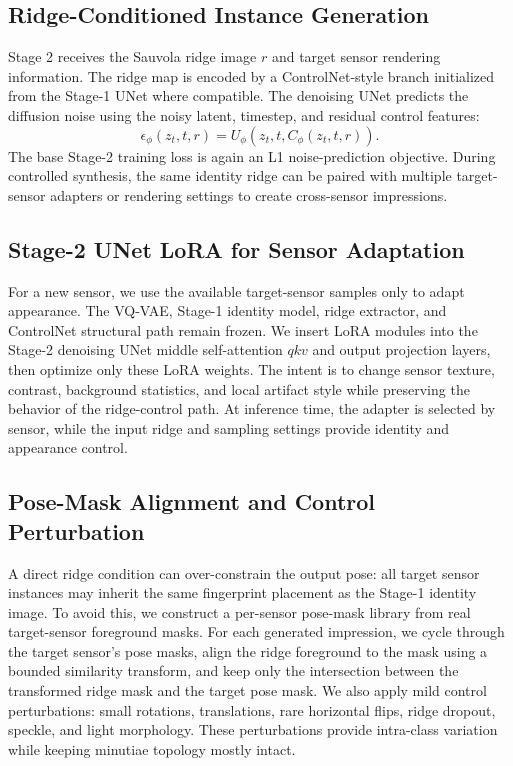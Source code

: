 \documentclass{article}
\begin{document}
\subsection{Ridge-Conditioned Instance Generation}

Stage 2 receives the Sauvola ridge image $r$ and target sensor rendering
information.  The ridge map is encoded by a ControlNet-style branch initialized
from the Stage-1 UNet where compatible.  The denoising UNet predicts the
diffusion noise using the noisy latent, timestep, and residual control
features:
\[
    \epsilon_\phi(z_t,t,r) =
    U_\phi\left(z_t,t,C_\phi(z_t,t,r)\right).
\]
The base Stage-2 training loss is again an L1 noise-prediction objective.
During controlled synthesis, the same identity ridge can be paired with
multiple target-sensor adapters or rendering settings to create cross-sensor
impressions.

\subsection{Stage-2 UNet LoRA for Sensor Adaptation}

For a new sensor, we use the available target-sensor samples only to adapt
appearance.  The VQ-VAE, Stage-1 identity model, ridge extractor, and
ControlNet structural path remain frozen.  We insert LoRA modules into the
Stage-2 denoising UNet middle self-attention $qkv$ and output projection
layers, then optimize only these LoRA weights.
The intent is to change sensor texture, contrast, background statistics, and
local artifact style while preserving the behavior of the ridge-control path.
At inference time, the adapter is selected by sensor, while the input ridge and
sampling settings provide identity and appearance control.

\subsection{Pose-Mask Alignment and Control Perturbation}

A direct ridge condition can over-constrain the output pose: all target sensor
instances may inherit the same fingerprint placement as the Stage-1 identity
image.  To avoid this, we construct a per-sensor pose-mask library from real
target-sensor foreground masks.  For each generated impression, we cycle
through the target sensor's pose masks, align the ridge foreground to the mask
using a bounded similarity transform, and keep only the intersection between
the transformed ridge mask and the target pose mask.  We also apply mild
control perturbations: small rotations, translations, rare horizontal flips,
ridge dropout, speckle, and light morphology.  These perturbations provide
intra-class variation while keeping minutiae topology mostly intact.
\end{document}
